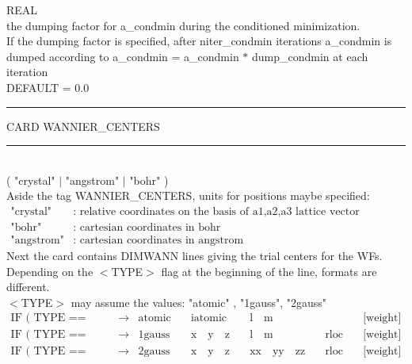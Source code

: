 {\noindent{}%
REAL \\ the dumping factor for a\_condmin during the conditioned minimization.\\
              If the dumping factor is specified, after niter\_condmin iterations a\_condmin
              is dumped according to
                 a\_condmin = a\_condmin $*$ dump\_condmin
              at each iteration\\
DEFAULT = 0.0 \par
}
\bigskip

\begin{centering}
\rule{2.0in}{0.01in} CARD WANNIER\_CENTERS \rule{2.0in}{0.01in}
\end{centering}\\

( "crystal" $\mid$ "angstrom" $\mid$ "bohr" )\\

\noindent Aside the tag WANNIER\_CENTERS, units for positions maybe specified:\\
$\begin{array}{ll}
\textrm{"crystal"}  & \textrm{: relative coordinates on the basis of a1,a2,a3 lattice vector (default)}\\
\textrm{"bohr"}     & \textrm{: cartesian coordinates in bohr}\\
\textrm{"angstrom"} & \textrm{: cartesian coordinates in angstrom}
\end{array}$\\

\noindent Next the card contains DIMWANN lines giving the trial centers for the WFs.
Depending on the $<$TYPE$>$ flag at the beginning of the line,
formats are different.\\

\noindent $<$TYPE$>$ may assume the values: "atomic" , "1gauss", "2gauss" \\
\begin{displaymath}
\begin{array}{lllllll}
\textrm{IF ( TYPE == "atomic" )}  & \rightarrow
& \textrm{atomic}
&\quad \textrm{iatomic}
&\quad \textrm{l} \quad  \textrm{m}
&\quad \textrm{ }
&\quad \textrm{[weight]}\\
\textrm{IF ( TYPE == "1gauss" )}  & \rightarrow
& \textrm{1gauss}
&\quad \textrm{x} \quad  \textrm{y} \quad  \textrm{z}
&\quad \textrm{l} \quad  \textrm{m}
&\quad \textrm{rloc}
&\quad \textrm{[weight]} \\
\textrm{IF ( TYPE == "2gauss" )}  & \rightarrow
& \textrm{2gauss}
&\quad \textrm{x} \quad  \textrm{y} \quad  \textrm{z}
&\quad \textrm{xx} \quad  \textrm{yy} \quad  \textrm{zz}
&\quad \textrm{rloc}
&\quad \textrm{[weight]}
\end{array}
\end{displaymath}\bigskip

